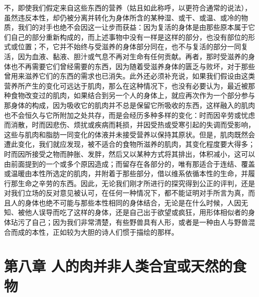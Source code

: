 不，即使我们假定来自这些东西的营养（姑且如此称呼，以更符合通常的说法），虽然违反本性，却仍被分离并转化为身体所含的某种湿、或干、或温、或冷的物质，我们的对手也绝不会因这一让步而获益：因为复活的身体是由那些原本属于它们自己的部分重新构成的，而上述事物中没有一样是这样的部分，也没有部位的形式或位置；不，它并不始终与受滋养的身体部分同在，也不与复活的部分一同复活，因为血液、黏液、胆汁或气息不再对生命有任何贡献。再者，那时受滋养的身体也不再需要它们曾经需要的东西，因为随着受滋养身体的匮乏与败坏，对于那些曾用来滋养它们的东西的需求也已消失。此外还必须补充说，如果我们假设由这类营养所产生的变化可远达于肌肉，那么在这种情况下，也没有必要认为，最近被那种食物改变过的肌肉，如果结合到另一个人的身体上，就应再次作为一个部分参与那身体的构成，因为吸收它的肌肉并不总是保留它所吸收的东西，这样融入的肌肉也不会恒久与它所附加之处共存，而是会经历多种多样的变化：时而因辛劳或忧虑而消散，时而因悲伤、烦扰或疾病而耗损，并因受热或受寒引起的失调而受影响，这些与肌肉和脂肪一同变化的体液并未接受营养以保持其原状。但是，肌肉既然会遭此变化，我们就应发现，被不适合的食物所滋养的肌肉，其变化程度要大得多；时而因所接受之物而肿胀、发胖，然后又以某种方式将其排出，体积减小，这可以由前面提到的一个或多个原因造成；而留存在各部分的，唯有那适合于连结、覆盖或温暖由本性所选定的肌肉，并附着于那些部分，借以维系依循本性的生命，并履行那生命之辛劳的东西。因此，无论我们刚才所进行的探究得到公正的评判，还是对我们立场的反对意见被认可，在任何一种情况下，都不能证明对手所言为真，而且人的身体也绝不可能与那些本性相同的身体结合，无论是在什么时候，人因无知、被他人误导而吃了这样的身体，还是自己出于欲望或疯狂，用形体相似者的身体玷污了自己；因为我们非常清楚，有些野兽具有人形，或者是一种由人与野兽混合而成的本性，正如较为大胆的诗人们惯于描绘的那样。\par


\section{第八章 人的肉并非人类合宜或天然的食物}


